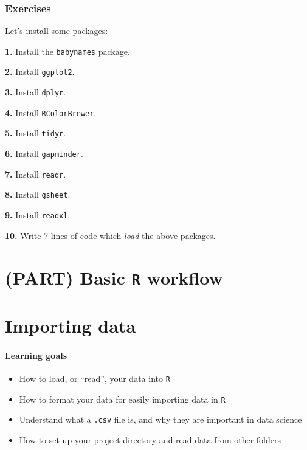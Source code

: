 \documentclass[]{book}
\providecommand{\tightlist}{%
  \setlength{\itemsep}{0pt}\setlength{\parskip}{0pt}}
\begin{document}
\hypertarget{exercises-6}{%
\subsection*{Exercises}\label{exercises-6}}

Let's install some packages:

\textbf{1.} Install the \texttt{babynames} package.

\textbf{2.} Install \texttt{ggplot2}.

\textbf{3.} Install \texttt{dplyr}.

\textbf{4.} Install \texttt{RColorBrewer}.

\textbf{5.} Install \texttt{tidyr}.

\textbf{6.} Install \texttt{gapminder}.

\textbf{7.} Install \texttt{readr}.

\textbf{8.} Install \texttt{gsheet}.

\textbf{9.} Install \texttt{readxl}.

\textbf{10.} Write 7 lines of code which \emph{load} the above packages.

\hypertarget{part-basic-r-workflow}{%
\chapter*{\texorpdfstring{(PART) Basic \texttt{R} workflow}{(PART) Basic R workflow}}\label{part-basic-r-workflow}}

\hypertarget{importing-data}{%
\chapter{Importing data}\label{importing-data}}

\hypertarget{learning-goals-7}{%
\subsubsection*{Learning goals}\label{learning-goals-7}}

\begin{itemize}
\tightlist
\item
  How to load, or ``read'', your data into \texttt{R}
\item
  How to format your data for easily importing data in \texttt{R}
\item
  Understand what a \texttt{.csv} file is, and why they are important in data science
\item
  How to set up your project directory and read data from other folders
\end{itemize}
\end{document}
